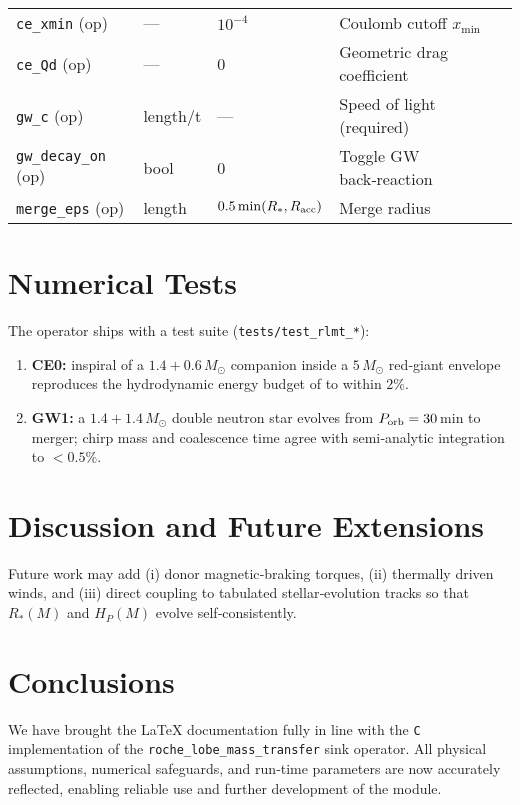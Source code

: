 \documentclass[11pt]{article}
\begin{document}
\begin{table}[h]
\begin{tabular}{@{}lllll@{}}
\texttt{ce\_xmin}           (op) & — & $10^{-4}$ & Coulomb cutoff $x_{\min}$\\
\texttt{ce\_Qd}             (op) & — & 0 & Geometric drag coefficient\\[0.2em]
%
\texttt{gw\_c}              (op) & length/t & — & Speed of light (required)\\
\texttt{gw\_decay\_on}      (op) & bool & 0 & Toggle GW back‑reaction\\[0.2em]
%
\texttt{merge\_eps}         (op) & length & $0.5\min(R_*,R_{\rm acc})$ & Merge radius\\
\bottomrule
\end{tabular}
\end{table}

\section{Numerical Tests}
\label{sec:tests}
The operator ships with a test suite (\texttt{tests/test\_rlmt\_*}):

\begin{enumerate}[nosep]
\item \textbf{CE0:} inspiral of a $1.4+0.6\,M_\odot$ companion inside a
      $5\,M_\odot$ red‑giant envelope reproduces the hydrodynamic energy
      budget of \citet{Fragos2019} to within $2\%$.
\item \textbf{GW1:} a $1.4+1.4\,M_\odot$ double neutron star evolves from
      $P_{\rm orb}=30$ min to merger; chirp mass and coalescence time agree
      with semi‑analytic integration to $<0.5\%$.
\end{enumerate}

\section{Discussion and Future Extensions}
\label{sec:future}
Future work may add
(i) donor magnetic‑braking torques,
(ii) thermally driven winds, and
(iii) direct coupling to tabulated stellar‑evolution tracks
so that $R_*(M)$ and $H_P(M)$ evolve self‑consistently.

\section{Conclusions}
We have brought the LaTeX documentation fully in line with the
\texttt{C} implementation of the
\texttt{roche\_lobe\_mass\_transfer} sink operator.
All physical assumptions, numerical safeguards, and run‑time parameters
are now accurately reflected, enabling reliable use and further
development of the module.
\end{document}
